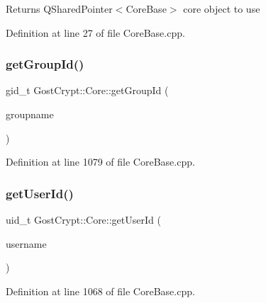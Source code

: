 \begin{DoxyReturn}{Returns}
Q\+Shared\+Pointer$<$\+Core\+Base$>$ core object to use 
\end{DoxyReturn}


Definition at line 27 of file Core\+Base.\+cpp.

\mbox{\label{namespace_gost_crypt_1_1_core_a8ed446713a9144223305012b80e4395d}} 
\subsubsection{\texorpdfstring{get\+Group\+Id()}{getGroupId()}}
{\footnotesize\ttfamily gid\+\_\+t Gost\+Crypt\+::\+Core\+::get\+Group\+Id (\begin{DoxyParamCaption}\item[{Q\+String}]{groupname }\end{DoxyParamCaption})}



Definition at line 1079 of file Core\+Base.\+cpp.

\mbox{\label{namespace_gost_crypt_1_1_core_af5a4d81b86fc0ab8033cb685f9cac213}} 
\subsubsection{\texorpdfstring{get\+User\+Id()}{getUserId()}}
{\footnotesize\ttfamily uid\+\_\+t Gost\+Crypt\+::\+Core\+::get\+User\+Id (\begin{DoxyParamCaption}\item[{Q\+String}]{username }\end{DoxyParamCaption})}



Definition at line 1068 of file Core\+Base.\+cpp.

\mbox{\label{namespace_gost_crypt_1_1_core_a89e961f21dc6df65d86cec0196e18919}} 
